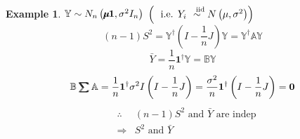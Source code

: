 \documentclass{article}
\newtheorem{example}[theorem]{Example}
\begin{document}
\bigskip 

\begin{example}
$\mathbb{Y}\sim N_{n}\left( \mathbb{%
\mu\mkern-12.3mu\mu%
}\boldsymbol{1},\sigma ^{2}I_{n}\right) $ $\left( \text{i.e. }Y_{i}\overset{%
\text{iid}}{\sim }N\left( \mu ,\sigma ^{2}\right) \right) $%
\begin{equation*}
\left( n-1\right) S^{2}=\mathbb{Y}^{\dagger }\left( I-\frac{1}{n}J\right) 
\mathbb{Y=Y}^{\dagger }\mathbb{AY}
\end{equation*}%
\begin{equation*}
\bar{Y}=\frac{1}{n}\boldsymbol{1}^{\dagger }\mathbb{Y}=\mathbb{BY}
\end{equation*}%
\begin{equation*}
\mathbb{B}%
\tsum\mkern-20mu\tsum%
\mathbb{A}=\frac{1}{n}\boldsymbol{1}^{\dagger }\sigma ^{2}I\left( I-\frac{1}{%
n}J\right) =\frac{\sigma ^{2}}{n}\boldsymbol{1}^{\dagger }\left( I-\frac{1}{n%
}J\right) =\boldsymbol{0}
\end{equation*}%
\begin{eqnarray*}
&\therefore &\left( n-1\right) S^{2}\text{ and }\bar{Y}\text{ are indep} \\
&\Rightarrow &S^{2}\text{ and }\bar{Y}
\end{eqnarray*}
\end{example}

\bigskip 
\end{document}
